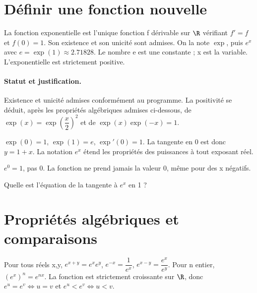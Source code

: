 \section{Définir une fonction nouvelle}\label{C09-U1}
\begin{keypoint}
La fonction exponentielle est l’unique fonction f dérivable sur $\R$ vérifiant $f\prime=f$ et $f(0)=1$. Son existence et son unicité sont admises. On la note $\exp$, puis $e^x$ avec $e=\exp(1)\approx\num{2,71828}$. Le nombre e est une constante ; x est la variable. L’exponentielle est strictement positive.
\end{keypoint}
\paragraph{Statut et justification.} Existence et unicité admises conformément au programme. La positivité se déduit, après les propriétés algébriques admises ci-dessous, de $\exp (x)=\exp (\dfrac{x}{2})^2$ et de $\exp(x)\exp(-x)=1$.
\begin{example}$\exp(0)=1$, $\exp(1)=e$, $\exp\prime(0)=1$. La tangente en 0 est donc $y=1+x$. La notation $e^x$ étend les propriétés des puissances à tout exposant réel.\end{example}\label{C09-EX1}
\begin{pitfall}$e^0=1$, pas 0. La fonction ne prend jamais la valeur 0, même pour des x négatifs.\end{pitfall}
\begin{application}Quelle est l’équation de la tangente à $e^x$ en 1 ?\end{application}\label{C09-AP1}
\section{Propriétés algébriques et comparaisons}\label{C09-U2}
\begin{keypoint}
Pour tous réels x,y, $e^{x+y}=e^xe^y$, $e^{-x}=\dfrac{1}{e^x}$, $e^{x-y}=\dfrac{e^x}{e^y}$. Pour n entier, $(e^x)^n=e^{nx}$. La fonction est strictement croissante sur $\R$, donc $e^u=e^v\iff u=v$ et $e^u<e^v\iff u<v$.
\end{keypoint}
